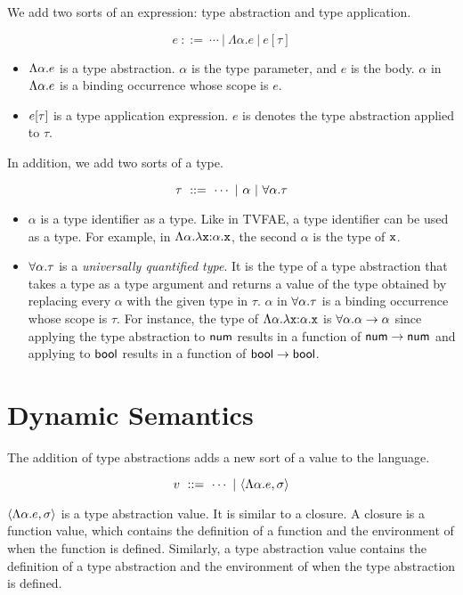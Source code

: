 We add two sorts of an expression: type abstraction and type application.

\[ e\ ::=\ \cdots \ |\ \Lambda\alpha.e \ |\ e[\tau] \]

\begin{itemize}
  \item $\Lambda\alpha.e$ is a type abstraction. $\alpha$ is the type
    parameter, and $e$ is the body. $\alpha$ in $\Lambda\alpha.e$
    is a binding occurrence whose scope is $e$.
  \item $e[\tau]$ is a type application expression. $e$ is denotes the type
    abstraction applied to $\tau$.
\end{itemize}

In addition, we add two sorts of a type.

\[ \tau\ ::=\ \cdots \ |\ \alpha \ |\ \tforall{\alpha}{\tau} \]

\begin{itemize}
  \item $\alpha$ is a type identifier as a type. Like in \textsf{TVFAE}, a
    type identifier can be used as a type.
    For example, in $\Lambda\alpha.\lambda\texttt{x}{:}\alpha.\texttt{x}$, the second
    $\alpha$ is the type of $\texttt{x}$.
  \item $\forall\alpha.\tau$ is a \textit{universally quantified
    type}. It is the type of a type
    abstraction that takes a type as a type argument and returns a value of the type
    obtained by replacing every $\alpha$ with the given type in $\tau$.
    $\alpha$ in $\forall\alpha.\tau$ is a binding occurrence whose scope is
    $\tau$.
    For instance, the type of $\Lambda\alpha.\lambda\texttt{x}{:}\alpha.\texttt{x}$ is
    $\forall\alpha.\alpha\rightarrow\alpha$ since applying the type
    abstraction to $\textsf{num}$ results in a function of $\textsf{num}\rightarrow\textsf{num}$ and
    applying to $\textsf{bool}$ results in a function of $\textsf{bool}\rightarrow\textsf{bool}$.
\end{itemize}

\section{Dynamic Semantics}

The addition of type abstractions adds a new sort of a value to the language.

\[ v\ ::=\ \cdots \ |\ \tclov{\alpha}{e}{\sigma} \]

$\langle\Lambda\alpha.e,\sigma\rangle$ is a type abstraction value. It is similar to a
closure. A closure is a function value, which contains the definition of a
function and the environment of when the function is defined. Similarly, a type
abstraction value contains the definition of a type abstraction and the
environment of when the type abstraction is defined.

